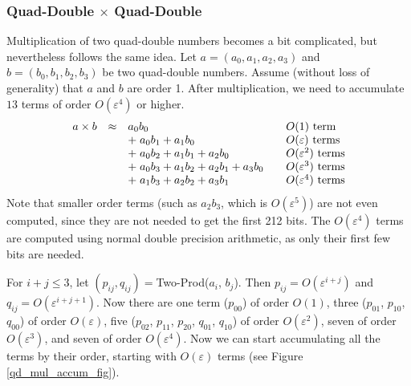 \documentclass[11pt]{article}
\theoremstyle{definition}
\newcommand{\eps}{\varepsilon}
\begin{document}
\subsubsection{Quad-Double $\times$ Quad-Double}
Multiplication of two quad-double numbers becomes a bit complicated, 
but nevertheless follows the same idea.  Let $a = (a_0, a_1, a_2, a_3)$
and $b = (b_0, b_1, b_2, b_3)$ be two quad-double numbers.  Assume
(without loss of generality) that $a$ and $b$ are order 1.
After multiplication, we need to accumulate $13$ terms of order $O(\eps^4)$
or higher.
\begin{displaymath}
  \begin{array}{rcl@{\qquad}l}
    a \times b &\approx& a_0 b_0 & O(1) \textrm{ term} \\
    & & +\; a_0 b_1 + a_1 b_0 & O(\eps) \textrm{ terms}\\
    & & +\;a_0 b_2 + a_1 b_1 + a_2 b_0 & O(\eps^2) \textrm{ terms}\\
    & & +\;a_0 b_3 + a_1 b_2 + a_2 b_1 + a_3 b_0 & O(\eps^3) \textrm{ terms}\\
    & & +\;a_1 b_3 + a_2 b_2 + a_3 b_1 & O(\eps^4) \textrm{ terms}
  \end{array}
\end{displaymath}
Note that smaller order terms (such as $a_2 b_3$, which is $O(\eps^5)$)
are not even computed, since they are not needed to get the first
212 bits.  The $O(\eps^4)$ terms are computed using normal double
precision arithmetic, as only their first few bits are needed.

For $i+j \le 3$, let $(p_{ij}, q_{ij}) = ${\sc Two-Prod}($a_i$, $b_j$).  
Then $p_{ij} = O(\eps^{i+j})$ and $q_{ij} = O(\eps^{i+j+1})$.
Now there are one term ($p_{00}$) of order $O(1)$, three 
($p_{01}$, $p_{10}$, $q_{00}$) of order $O(\eps)$, five 
($p_{02}$, $p_{11}$, $p_{20}$, $q_{01}$, $q_{10}$) 
of order $O(\eps^2)$, seven of order $O(\eps^3)$, 
and seven of order $O(\eps^4)$.
Now we can start accumulating all the terms by their order, 
starting with $O(\eps)$ terms (see Figure \ref{qd_mul_accum_fig}).
\end{document}
